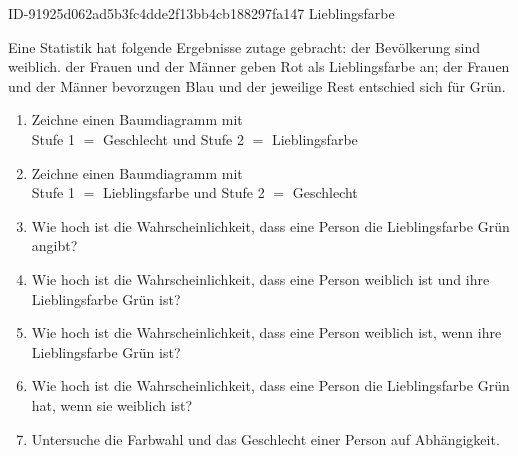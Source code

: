 \begin{exercise}
      {ID-91925d062ad5b3fc4dde2f13bb4cb188297fa147}
      {Lieblingsfarbe}
  \ifproblem\problem\par
    Eine Statistik hat folgende Ergebnisse zutage gebracht:  der
    Bevölkerung sind weiblich.  der Frauen und  der Männer
    geben Rot als Lieblingsfarbe an;  der Frauen und  der
    Männer bevorzugen Blau und der jeweilige Rest entschied sich für Grün.
    \begin{enumerate}
      \item Zeichne einen Baumdiagramm mit\\
            Stufe 1 $=$ Geschlecht und
            Stufe 2 $=$ Lieblingsfarbe
      \item Zeichne einen Baumdiagramm mit\\
            Stufe 1 $=$ Lieblingsfarbe und
            Stufe 2 $=$ Geschlecht
      \item Wie hoch ist die Wahrscheinlichkeit, dass eine Person die
            Lieblingsfarbe Grün angibt?
      \item Wie hoch ist die Wahrscheinlichkeit, dass eine Person weiblich
            ist und ihre Lieblingsfarbe Grün ist?
      \item Wie hoch ist die Wahrscheinlichkeit, dass eine Person weiblich ist,
            wenn ihre Lieblingsfarbe Grün ist?
      \item Wie hoch ist die Wahrscheinlichkeit, dass eine Person die
            Lieblingsfarbe Grün hat, wenn sie weiblich ist?
      \item Untersuche die Farbwahl und das Geschlecht einer Person
            auf Abhängigkeit.
    \end{enumerate}
  \fi
\end{exercise}
